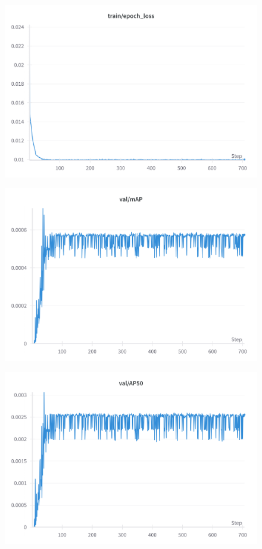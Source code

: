 \begin{figure}[htp]
  \begin{minipage}[b]{0.32\linewidth}
    \centering
    \includegraphics[width=\linewidth]{figures/loss_Base.png}
    \label{fig:loss_base}
  \end{minipage}
  \hfill
  \begin{minipage}[b]{0.32\linewidth}
    \centering
    \includegraphics[width=\linewidth]{figures/mAP_Base.png}
    \label{fig:map_base}
  \end{minipage}
  \hfill
  \begin{minipage}[b]{0.32\linewidth}
    \centering
    \includegraphics[width=\linewidth]{figures/AP50_Base.png}

\end{minipage}
\end{figure}
